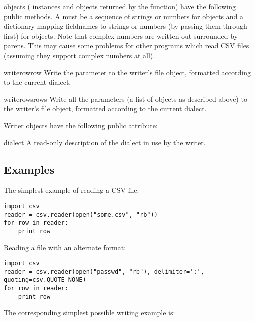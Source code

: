  objects ( instances and objects returned by
the  function) have the following public methods.  A
{} must be a sequence of strings or numbers for 
objects and a dictionary mapping fieldnames to strings or numbers (by
passing them through  first) for {}
objects.  Note that complex numbers are written out surrounded by parens.
This may cause some problems for other programs which read CSV files
(assuming they support complex numbers at all).

\begin{methoddesc}{writerow}{row}
Write the  parameter to the writer's file object, formatted
according to the current dialect.
\end{methoddesc}

\begin{methoddesc}{writerows}{rows}
Write all the  parameters (a list of  objects as
described above) to the writer's file object, formatted
according to the current dialect.
\end{methoddesc}

Writer objects have the following public attribute:

\begin{memberdesc}{dialect}
A read-only description of the dialect in use by the writer.
\end{memberdesc}



\subsection{Examples\label{csv-examples}}

The simplest example of reading a CSV file:

\begin{verbatim}
import csv
reader = csv.reader(open("some.csv", "rb"))
for row in reader:
    print row
\end{verbatim}

Reading a file with an alternate format:

\begin{verbatim}
import csv
reader = csv.reader(open("passwd", "rb"), delimiter=':', quoting=csv.QUOTE_NONE)
for row in reader:
    print row
\end{verbatim}

The corresponding simplest possible writing example is:

